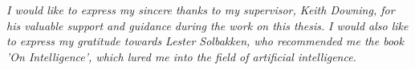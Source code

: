 \vspace*{7cm}
\begin{center}

\emph{I would like to express my sincere thanks to my supervisor, Keith Downing, for his valuable support and guidance during the work on this thesis.}
\newline
\newline
\emph{I would also like to express my gratitude towards Lester Solbakken, who recommended me the book 'On Intelligence', which lured me into the field of artificial intelligence.}


\end{center}

\cleardoublepage